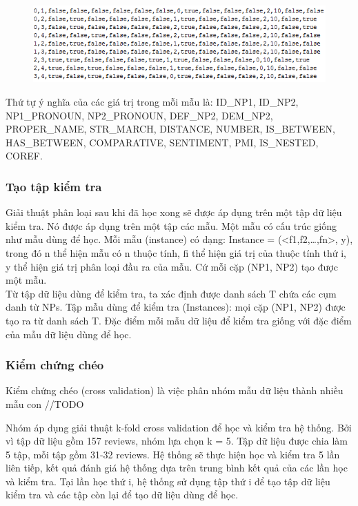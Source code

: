 \documentclass[12pt]{extarticle}
\begin{document}
				\begin{figure}[H] 
					\centering
					\includegraphics{images/examples_train.png}
				\end{figure} 
				\par Thứ tự ý nghĩa của các giá trị trong mỗi mẫu là: ID\_NP1, ID\_NP2, NP1\_PRONOUN, NP2\_PRONOUN, DEF\_NP2, DEM\_NP2, PROPER\_NAME, STR\_MARCH, DISTANCE, NUMBER, IS\_BETWEEN, HAS\_BETWEEN, COMPARATIVE, SENTIMENT, PMI, IS\_NESTED, COREF.
			\subsubsection*{Tạo tập kiểm tra}
				\par Giải thuật phân loại sau khi đã học xong sẽ được áp dụng trên một tập dữ liệu kiểm tra. Nó được áp dụng trên một tập các mẫu. Một mẫu có cấu trúc giống như mẫu dùng để học. Mỗi mẫu (instance) có dạng: Instance = (<f1,f2,…,fn>, y), trong đó n thể hiện mẫu có n thuộc tính, fi thể hiện giá trị của thuộc tính thứ i, y thể hiện giá trị phân loại đầu ra của mẫu. Cứ mỗi cặp (NP1, NP2) tạo được một mẫu. 
				\\Từ tập dữ liệu dùng để kiểm tra, ta xác định được danh sách T chứa các cụm danh từ NPs. Tập mẫu dùng để kiểm tra (Instances): mọi cặp (NP1, NP2) được tạo ra từ danh sách T. Đặc điểm mỗi mẫu dữ liệu để kiểm tra giống với đặc điểm của mẫu dữ liệu dùng để học.
			\subsubsection*{Kiểm chứng chéo}
				\par Kiểm chứng chéo (cross validation) là việc phân nhóm mẫu dữ liệu thành nhiều mẫu con //TODO
				\par Nhóm áp dụng giải thuật k-fold cross validation để học và kiểm tra hệ thống. Bởi vì tập dữ liệu gồm 157 reviews, nhóm lựa chọn k = 5. Tập dữ liệu được chia làm 5 tập, mỗi tập gồm 31-32 reviews. Hệ thống sẽ thực hiện học và kiểm tra 5 lần liên tiếp, kết quả đánh giá hệ thống dựa trên trung bình kết quả của các lần học và kiểm tra. Tại lần học thứ i, hệ thống sử dụng tập thứ i để tạo tập dữ liệu kiểm tra và các tập còn lại để tạo dữ liệu dùng để học.
\end{document}
